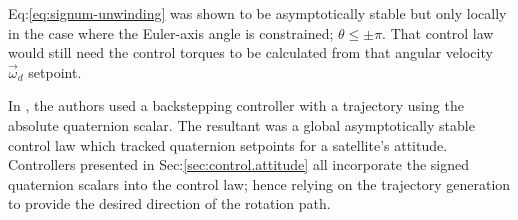 Eq:\ref{eq:signum-unwinding} was shown to be asymptotically stable but only locally in the case where the Euler-axis angle is constrained; $\theta\leq \pm\pi$. That control law  would still need the control torques to be calculated from that angular velocity $\vec{\omega}_d$ setpoint.
\par
In \cite{intelligentbackstep}, the authors used a backstepping controller with a trajectory using the absolute quaternion scalar. The resultant was a global asymptotically stable control law which tracked quaternion setpoints for a satellite's attitude. Controllers presented in Sec:\ref{sec:control.attitude} all incorporate the signed quaternion scalars into the control law;  hence relying on the trajectory generation to provide the desired direction of the rotation path.
\newpage
